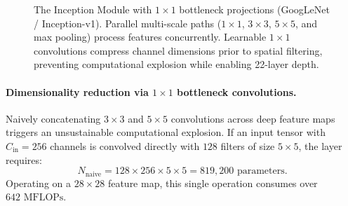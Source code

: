 \begin{figure}[H]
{%
}
\caption{The Inception Module with $1 \times 1$ bottleneck projections (GoogLeNet / Inception-v1). Parallel multi-scale paths ($1 \times 1$, $3 \times 3$, $5 \times 5$, and max pooling) process features concurrently. Learnable $1 \times 1$ convolutions compress channel dimensions prior to spatial filtering, preventing computational explosion while enabling 22-layer depth.}
\label{fig:inception_module_schematic}
\end{figure}

\paragraph{Dimensionality reduction via $1 \times 1$ bottleneck convolutions.}
Naively concatenating $3 \times 3$ and $5 \times 5$ convolutions across deep feature maps triggers an unsustainable computational explosion. If an input tensor with $C_{\text{in}} = 256$ channels is convolved directly with $128$ filters of size $5 \times 5$, the layer requires:
\begin{equation}
N_{\text{naive}} = 128 \times 256 \times 5 \times 5 = 819,200 \text{ parameters}.
\end{equation}
Operating on a $28 \times 28$ feature map, this single operation consumes over $642\text{ MFLOPs}$.

